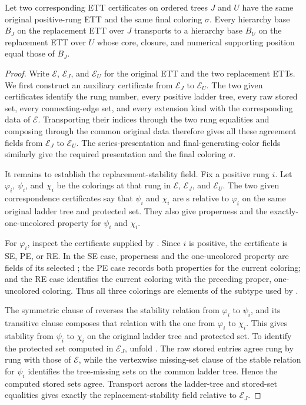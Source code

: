 \begin{helper}
Let two corresponding ETT certificates on ordered trees $J$ and $U$ have
the same original positive-rung ETT and the same final coloring $\sigma$.
Every hierarchy base $B_J$ on the replacement ETT over $J$ transports to
a hierarchy base $B_U$ on the replacement ETT over $U$ whose core, closure,
and numerical supporting position equal those of $B_J$.
\end{helper}
\begin{proof}
Write $\mathcal E$, $\mathcal E_J$, and $\mathcal E_U$ for the original
ETT and the two replacement ETTs.  We first construct an auxiliary
 certificate from
$\mathcal E_J$ to $\mathcal E_U$.  The two given certificates identify
the rung number, every positive ladder tree, every raw stored set, every
connecting-edge set, and every extension kind with the corresponding data
of $\mathcal E$.  Transporting their indices through the two rung
equalities and composing through the common original data therefore gives
all these agreement fields from $\mathcal E_J$ to $\mathcal E_U$.  The
series-presentation and final-generating-color fields similarly give the
required presentation and the final coloring $\sigma$.

It remains to establish the replacement-stability field.  Fix a positive
rung $i$.  Let $\varphi_i$, $\psi_i$, and $\chi_i$ be the colorings at
that rung in $\mathcal E$, $\mathcal E_J$, and $\mathcal E_U$.  The two
given correspondence certificates say that $\psi_i$ and $\chi_i$ are
s relative to $\varphi_i$ on the same original
ladder tree and protected set.  They also give properness and the
exactly-one-uncolored property for $\psi_i$ and $\chi_i$.

For $\varphi_i$, inspect the certificate supplied by
.  Since $i$ is positive, the
 certificate is SE, PE, or RE.  In the SE
case, properness and the one-uncolored property are fields of its selected
; the PE case records both properties for
the current coloring; and the RE case identifies the current coloring
with the preceding proper, one-uncolored coloring.  Thus all three
colorings are elements of the subtype used by .

The symmetric clause of  reverses the stability relation
from $\varphi_i$ to $\psi_i$, and its transitive clause composes that
relation with the one from $\varphi_i$ to $\chi_i$.  This gives stability
from $\psi_i$ to $\chi_i$ on the original ladder tree and protected set.
To identify the protected set computed in $\mathcal E_J$, unfold
.  The raw stored entries agree rung by
rung with those of $\mathcal E$, while the vertexwise missing-set clause
of the stable relation for $\psi_i$ identifies the tree-missing sets on
the common ladder tree.  Hence the computed stored sets agree.  Transport
across the ladder-tree and stored-set equalities gives exactly the
replacement-stability field relative to $\mathcal E_J$.


\end{proof}
